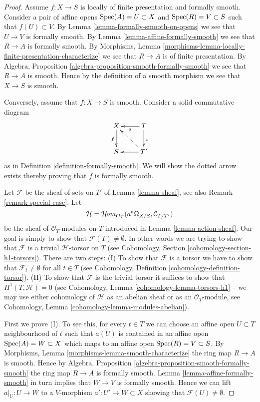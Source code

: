\begin{proof}
Assume $f : X \to S$ is locally of finite presentation and formally smooth.
Consider a pair of affine opens $\mathop{\rm Spec}(A) = U \subset X$ and
$\mathop{\rm Spec}(R) = V \subset S$
such that $f(U) \subset V$. By Lemma \ref{lemma-formally-smooth-on-opens}
we see that $U \to V$ is formally smooth. By Lemma
\ref{lemma-affine-formally-smooth} we see that $R \to A$ is formally
smooth. By
Morphisms, Lemma \ref{morphisms-lemma-locally-finite-presentation-characterize}
we see that $R \to A$ is of finite presentation.
By Algebra, Proposition \ref{algebra-proposition-smooth-formally-smooth}
we see that $R \to A$ is smooth.
Hence by the definition of a smooth morphism we see that $X \to S$ is smooth.

\medskip\noindent
Conversely, assume that $f : X \to S$ is smooth. Consider a solid commutative
diagram
$$
\xymatrix{
X \ar[d]_f & T \ar[d]^i \ar[l]^a \\
S & T' \ar[l] \ar@{-->}[lu]
}
$$
as in Definition \ref{definition-formally-smooth}.
We will show the dotted arrow exists thereby
proving that $f$ is formally smooth.

\medskip\noindent
Let $\mathcal{F}$ be the sheaf of sets on $T'$ of
Lemma \ref{lemma-sheaf},
see also
Remark \ref{remark-special-case}.
Let
$$
\mathcal{H} =
\mathop{\mathcal{H}\!{\it om}}\nolimits_{\mathcal{O}_T}(a^*\Omega_{X/S}, \mathcal{C}_{T/T'})
$$
be the sheaf of $\mathcal{O}_T$-modules on $T$ introduced in
Lemma \ref{lemma-action-sheaf}. Our goal is simply
to show that $\mathcal{F}(T) \not = \emptyset$. In other words we
are trying to show that $\mathcal{F}$ is a trivial $\mathcal{H}$-torsor
on $T$ (see Cohomology, Section \ref{cohomology-section-h1-torsors}).
There are two steps: (I) To show that $\mathcal{F}$ is a torsor
we have to show that $\mathcal{F}_t \not = \emptyset$ for all $t \in T$ (see
Cohomology, Definition \ref{cohomology-definition-torsor}).
(II) To show that $\mathcal{F}$ is the trivial torsor it suffices
to show that $H^1(T, \mathcal{H}) = 0$ (see
Cohomology, Lemma \ref{cohomology-lemma-torsors-h1} --
we may use either cohomology
of $\mathcal{H}$ as an abelian sheaf or as an $\mathcal{O}_T$-module,
see Cohomology, Lemma \ref{cohomology-lemma-modules-abelian}).

\medskip\noindent
First we prove (I). To see this, for every $t \in T$ we can
choose an affine open $U \subset T$ neighbourhood of $t$
such that $a(U)$ is contained
in an affine open $\mathop{\rm Spec}(A) = W \subset X$
which maps to an affine open $\mathop{\rm Spec}(R) = V \subset S$.
By Morphisms, Lemma \ref{morphisms-lemma-smooth-characterize}
the ring map $R \to A$ is smooth.
Hence by Algebra, Proposition \ref{algebra-proposition-smooth-formally-smooth}
the ring map $R \to A$ is formally smooth.
Lemma \ref{lemma-affine-formally-smooth}
in turn implies that $W \to V$ is formally smooth.
Hence we can lift $a|_U : U \to W$ to a $V$-morphism
$a' : U' \to W \subset X$ showing that $\mathcal{F}(U) \not = \emptyset$.


\end{proof}
